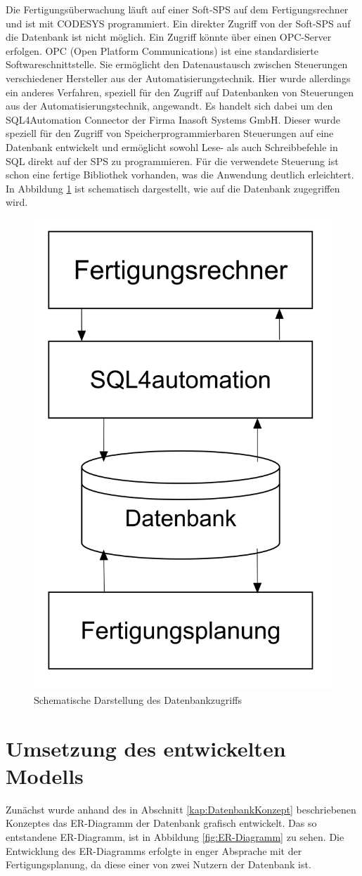 Die Fertigungsüberwachung läuft auf einer Soft-SPS auf dem Fertigungsrechner und ist mit CODESYS programmiert. Ein direkter Zugriff von der Soft-SPS auf die Datenbank ist nicht möglich. Ein Zugriff könnte über einen OPC-Server erfolgen. OPC (Open Platform Communications) ist eine standardisierte Softwareschnittstelle. Sie ermöglicht den Datenaustausch zwischen Steuerungen verschiedener Hersteller aus der Automatisierungstechnik. Hier wurde allerdings ein anderes Verfahren, speziell für den Zugriff auf Datenbanken von Steuerungen aus der Automatisierungstechnik, angewandt. Es handelt sich dabei um den SQL4Automation Connector der Firma Inasoft Systems GmbH. Dieser wurde speziell für den Zugriff von Speicherprogrammierbaren Steuerungen auf eine Datenbank entwickelt und ermöglicht sowohl Lese- als auch Schreibbefehle in SQL direkt auf der SPS zu programmieren. Für die verwendete Steuerung ist schon eine fertige Bibliothek vorhanden, was die Anwendung deutlich erleichtert. In Abbildung \ref{fig:DatenbankZugriffUebersicht} ist schematisch dargestellt, wie auf die Datenbank zugegriffen wird.

\begin{figure}[ht]
	    \centering
	    \includegraphics[width=0.4\linewidth]{Bilder/Datenbankdiagramm.png}
        \caption{Schematische Darstellung des Datenbankzugriffs}
        \label{fig:DatenbankZugriffUebersicht}
\end{figure}


\section{Umsetzung des entwickelten Modells}
Zunächst wurde anhand des in Abschnitt \ref{kap:DatenbankKonzept} beschriebenen Konzeptes das ER-\-Dia\-gramm der Datenbank grafisch entwickelt. Das so entstandene ER-Diagramm, ist in Abbildung \ref{fig:ER-Diagramm} zu sehen. Die Entwicklung des ER-Diagramms erfolgte in enger Absprache mit der Fertigungsplanung, da diese einer von zwei Nutzern der Datenbank ist.
 

